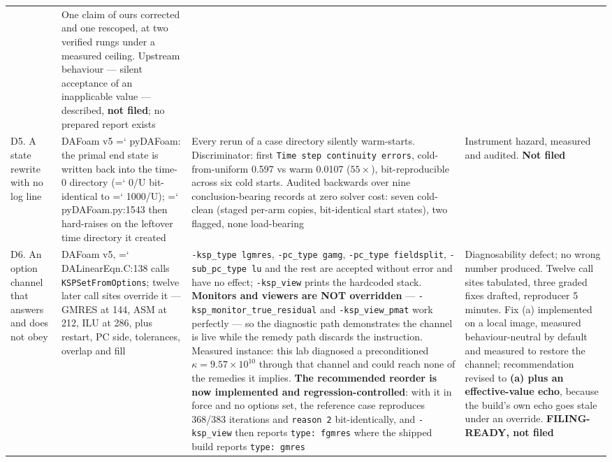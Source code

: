 \documentclass[11pt,a4paper]{article}
\newcommand{\artifact}[1]{{\small\ttfamily\hyphenchar\font=`\-\relax
  \def\_{\textunderscore\allowbreak}#1}}
\begin{document}
{\begin{longtable}{@{}L{2.4cm}L{3.1cm}L{5.9cm}L{3.2cm}@{}}
& One claim of ours corrected and one rescoped, at two verified rungs under a measured ceiling. Upstream behaviour --- silent acceptance of an inapplicable value --- described, \textbf{not filed}; no prepared report exists \\
\addlinespace
D5. A state rewrite with no log line
& DAFoam v5 \artifact{pyDAFoam}: the primal end state is written back into the time-0 directory (\artifact{0/U} bit-identical to \artifact{1000/U}); \artifact{pyDAFoam.py:1543} then hard-raises on the leftover time directory it created
& Every rerun of a case directory silently warm-starts. Discriminator: first \texttt{Time step continuity errors}, cold-from-uniform 0.597 vs warm 0.0107 (\(55\times\)), bit-reproducible across six cold starts. Audited backwards over nine conclusion-bearing records at zero solver cost: seven cold-clean (staged per-arm copies, bit-identical start states), two flagged, none load-bearing
& Instrument hazard, measured and audited. \textbf{Not filed} \\
\addlinespace
D6. An option channel that answers and does not obey
& DAFoam v5, \artifact{DALinearEqn.C:138} calls \texttt{KSPSetFromOptions}; twelve later call sites override it --- GMRES at 144, ASM at 212, ILU at 286, plus restart, PC side, tolerances, overlap and fill
& \texttt{-ksp\_type lgmres}, \texttt{-pc\_type gamg}, \texttt{-pc\_type fieldsplit}, \texttt{-sub\_pc\_type lu} and the rest are accepted without error and have no effect; \texttt{-ksp\_view} prints the hardcoded stack. \textbf{Monitors and viewers are NOT overridden} --- \texttt{-ksp\_monitor\_true\_residual} and \texttt{-ksp\_view\_pmat} work perfectly --- so the diagnostic path demonstrates the channel is live while the remedy path discards the instruction. Measured instance: this lab diagnosed a preconditioned \(\kappa=9.57\times10^{10}\) through that channel and could reach none of the remedies it implies. \textbf{The recommended reorder is now implemented and regression-controlled}: with it in force and no options set, the reference case reproduces 368/383 iterations and \texttt{reason 2} bit-identically, and \texttt{-ksp\_view} then reports \texttt{type: fgmres} where the shipped build reports \texttt{type: gmres}
& Diagnosability defect; no wrong number produced. Twelve call sites tabulated, three graded fixes drafted, reproducer 5 minutes. Fix (a) implemented on a local image, measured behaviour-neutral by default and measured to restore the channel; recommendation revised to \textbf{(a) plus an effective-value echo}, because the build's own echo goes stale under an override. \textbf{FILING-READY, not filed} \\
\end{longtable}
}
\end{document}
